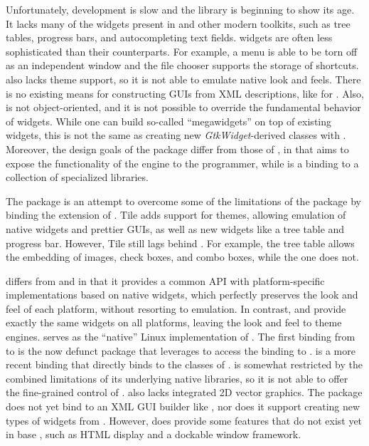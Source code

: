 \documentclass[article]{jss}
\begin{document}
Unfortunately,  development is slow and the library is beginning
to show its age. It lacks many of the widgets present in  and
other modern toolkits, such as tree tables, progress bars, and autocompleting
text fields.  widgets are often less sophisticated than their
 counterparts. For example, a  menu is able to be torn off
as an independent window and the  file chooser supports the storage
of shortcuts.  also lacks theme support, so it is not able to
emulate native look and feels. There is no existing means
for constructing  GUIs from XML descriptions, like 
\citep{libglade} for . Also,  is not object-oriented,
and it is not possible to override the fundamental behavior of widgets.
While one can build so-called ``megawidgets'' on top of existing
 widgets, this is not the same as creating new \emph{GtkWidget}-derived
classes with . Moreover, the design goals of the  package
differ from those of , in that  aims to expose the 
functionality of the  engine to the  programmer, while 
 is a binding to a collection of specialized  libraries.

The  package \citep{tcltk2} is an attempt to overcome some
of the limitations of the  package by binding the  extension
\citep{tcltk-tile} of . Tile adds support for themes, allowing
emulation of native widgets and prettier GUIs, as well as new widgets
like a tree table and progress bar. However, Tile still lags behind
. For example, the  tree table allows the embedding of images,
check boxes, and combo boxes, while the  one does not.

 \citep{wxwidgets} differs from  and  in 
that it provides a common API with 
platform-specific implementations based on native widgets, which perfectly 
preserves the look and feel of each platform, without resorting to emulation. 
In contrast,  and  provide exactly 
the same widgets on all platforms, leaving the look and feel to theme engines.
 serves as the ``native'' Linux implementation of .
The first binding from  to  is the now defunct 
package that leverages  to access the  binding to .
 \citep{RwxWidgets} is a more recent binding that
directly binds to the  classes of .
 is somewhat restricted by the combined
limitations of its underlying native libraries, so it is not able
to offer the fine-grained control of .  also lacks integrated
2D vector graphics. The  package does not yet
bind to an XML GUI builder like , nor does it support
creating new types of widgets from . However,  does
provide some features that do not exist yet in base , such as HTML display
and a dockable window framework. 
\end{document}
